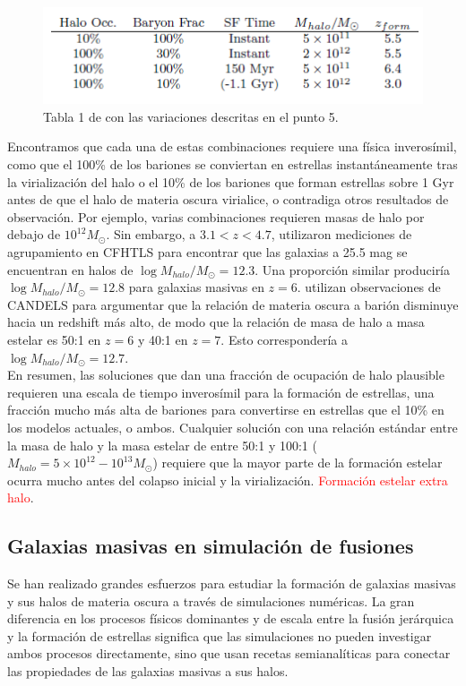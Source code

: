 \documentclass{article}
\begin{document}
\begin{figure}[h]
\begin{center}
\includegraphics[scale=0.7]{Figuras/steindhart_table}
\caption{\label{fig:table1} Tabla 1 de \cite{steinhardt2016impossibly} con las variaciones descritas en el punto 5.}
\end{center}
\end{figure}

Encontramos que cada una de estas combinaciones requiere una física inverosímil, como que el 100\% de los bariones se conviertan en estrellas instantáneamente tras la virialización del halo o el 10\% de los bariones que forman estrellas sobre 1 Gyr antes de que el halo de materia oscura virialice, o contradiga otros resultados de observación. Por ejemplo, varias combinaciones requieren masas de halo por debajo de $10^{12}M_\odot$. Sin embargo, a $3.1 <z <4.7$, \cite{hildebrandt2009cars} utilizaron mediciones de agrupamiento en CFHTLS para encontrar que las galaxias a 25.5 mag se encuentran en halos de $\log M_{halo} / M_\odot = 12.3$. Una proporción similar produciría $\log M_{halo} / M_\odot = 12.8$ para galaxias masivas en $z = 6$. \cite{finkelstein2015increasing} utilizan observaciones de CANDELS para argumentar que la relación de materia oscura a barión disminuye hacia un redshift más alto, de modo que la relación de masa de halo a masa estelar es 50:1 en $z = 6$ y 40:1 en $z = 7$. Esto correspondería a $\log M_{halo} / M_\odot = 12.7$.\\

En resumen, las soluciones que dan una fracción de ocupación de halo plausible requieren una escala de tiempo inverosímil para la formación de estrellas, una fracción mucho más alta de bariones para convertirse en estrellas que el 10\% en los modelos actuales, o ambos. Cualquier solución con una relación estándar entre la masa de halo y la masa estelar de entre 50:1 y 100:1 ($M_{halo }= 5 \times 10^{12} - 10^{13} M_\odot$) requiere que la mayor parte de la formación estelar ocurra mucho antes del colapso inicial y la virialización. \textcolor{red}{Formación estelar extra halo}.

\subsection{Galaxias masivas en simulación de fusiones}
Se han realizado grandes esfuerzos para estudiar la formación de galaxias masivas y sus halos de materia oscura a través de simulaciones numéricas. La gran diferencia en los procesos físicos dominantes y de escala entre la fusión jerárquica y la formación de estrellas significa que las simulaciones no pueden investigar ambos procesos directamente, sino que usan recetas semianalíticas para conectar las propiedades de las galaxias masivas a sus halos.\\
\end{document}

